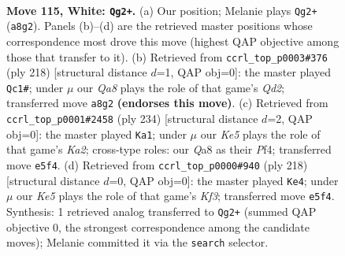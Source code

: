 \documentclass[11pt]{article}
\begin{document}
\clearpage

\begin{figure}[p]\centering
\begin{subfigure}{0.46\textwidth}\centering
\resizebox{\linewidth}{!}{%
\newchessgame
\chessboard[
  setfen={Q7/6k1/8/4K3/8/8/8/8 w - - 9 115},
  showmover=false,
  pgfstyle=straightmove, color=movearrow, markmove={a8-g2}
]}
\caption{}
\end{subfigure}\hfill
\begin{subfigure}{0.46\textwidth}\centering
\resizebox{\linewidth}{!}{%
\newchessgame
\chessboard[
  setfen={8/8/8/8/8/5K2/3Q4/5k2 w - - 8 110},
  showmover=false,
  pgfstyle=straightmove, color=movearrow, markmove={d2-c1}
]}
\caption{}
\end{subfigure}
\\[4pt]
\begin{subfigure}{0.46\textwidth}\centering
\resizebox{\linewidth}{!}{%
\newchessgame
\chessboard[
  setfen={8/8/8/8/1k3P2/8/K7/8 w - - 6 118},
  showmover=false,
  pgfstyle=straightmove, color=movearrow, markmove={a2-a1}
]}
\caption{}
\end{subfigure}\hfill
\begin{subfigure}{0.46\textwidth}\centering
\resizebox{\linewidth}{!}{%
\newchessgame
\chessboard[
  setfen={k7/8/8/1Q6/8/5K2/8/8 w - - 5 110},
  showmover=false,
  pgfstyle=straightmove, color=movearrow, markmove={f3-e4}
]}
\caption{}
\end{subfigure}
\caption{\textbf{Move 115, White: \texttt{Qg2+}.} (a) Our position; Melanie plays \texttt{Qg2+} (\texttt{a8g2}). Panels (b)--(d) are the retrieved master positions whose correspondence most drove this move (highest QAP objective among those that transfer to it). (b) Retrieved from \texttt{ccrl\_top\_p0003\#376} (ply 218) [structural distance $d$=1, QAP obj=0]: the master played \texttt{Qc1\#}; under $\mu$ our \emph{Qa8} plays the role of that game's \emph{Qd2}; transferred move \texttt{a8g2} \textbf{(endorses this move)}. (c) Retrieved from \texttt{ccrl\_top\_p0001\#2458} (ply 234) [structural distance $d$=2, QAP obj=0]: the master played \texttt{Ka1}; under $\mu$ our \emph{Ke5} plays the role of that game's \emph{Ka2}; cross-type roles: our \emph{Q}a8 as their \emph{P}f4; transferred move \texttt{e5f4}. (d) Retrieved from \texttt{ccrl\_top\_p0000\#940} (ply 218) [structural distance $d$=0, QAP obj=0]: the master played \texttt{Ke4}; under $\mu$ our \emph{Ke5} plays the role of that game's \emph{Kf3}; transferred move \texttt{e5f4}. Synthesis: 1 retrieved analog transferred to \texttt{Qg2+} (summed QAP objective 0, the strongest correspondence among the candidate moves); Melanie committed it via the \texttt{search} selector.}
\label{fig:thought-m228}
\end{figure}
\end{document}
